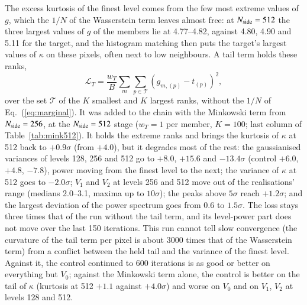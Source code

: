 \documentclass{aa}
\newcommand{\nside}{N_{\rm side}}
\begin{document}
The excess kurtosis of the finest level comes from the few most extreme values of $g$, which the $1/N$ of the Wasserstein term leaves almost free: at $\nside=512$ the three largest values of $g$ of the members lie at 4.77--4.82, against 4.80, 4.90 and 5.11 for the target, and the histogram matching then puts the target's largest values of $\kappa$ on these pixels, often next to low neighbours. A tail term holds these ranks,
\begin{equation}
\mathcal{L}_T = \frac{w_T}{B}\sum_m \sum_{p\in\mathcal{T}} \left(g_{m,(p)} - t_{(p)}\right)^2,
\end{equation}
over the set $\mathcal{T}$ of the $K$ smallest and $K$ largest ranks, without the $1/N$ of Eq.~(\ref{eq:marginal}). It was added to the chain with the Minkowski term from $\nside=256$, at the $\nside=512$ stage ($w_T=1$ per member, $K=100$; last column of Table~\ref{tab:mink512}). It holds the extreme ranks and brings the kurtosis of $\kappa$ at 512 back to $+0.9\sigma$ (from $+4.0$), but it degrades most of the rest: the gaussianised variances of levels 128, 256 and 512 go to $+8.0$, $+15.6$ and $-13.4\sigma$ (control $+6.0$, $+4.8$, $-7.8$), power moving from the finest level to the next; the variance of $\kappa$ at 512 goes to $-2.0\sigma$; $V_1$ and $V_2$ at levels 256 and 512 move out of the realisations' range (medians 2.0--3.1, maxima up to $10\sigma$); the peaks above $5\sigma$ reach $+1.2\sigma$; and the largest deviation of the power spectrum goes from 0.6 to $1.5\sigma$. The loss stays three times that of the run without the tail term, and its level-power part does not move over the last 150 iterations. This run cannot tell slow convergence (the curvature of the tail term per pixel is about 3000 times that of the Wasserstein term) from a conflict between the held tail and the variance of the finest level. Against it, the control continued to 600 iterations is as good or better on everything but $V_0$; against the Minkowski term alone, the control is better on the tail of $\kappa$ (kurtosis at 512 $+1.1$ against $+4.0\sigma$) and worse on $V_0$ and on $V_1$, $V_2$ at levels 128 and 512.
\end{document}
